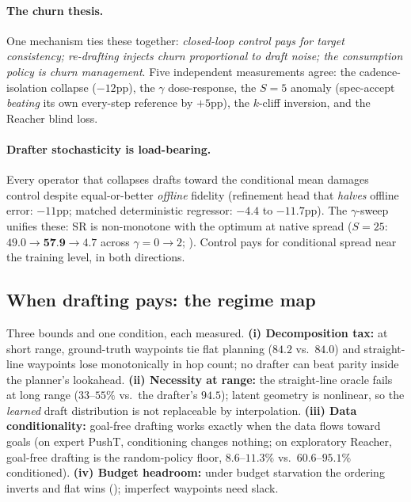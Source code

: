 \documentclass{article}
\newcommand{\ours}[1]{\textbf{#1}}
\begin{document}
\paragraph{The churn thesis.} One mechanism ties these together:
\emph{closed-loop control pays for target consistency; re-drafting injects
churn proportional to draft noise; the consumption policy is churn
management}. Five independent measurements agree: the cadence-isolation
collapse ($-12$pp), the $\gamma$ dose-response, the $S{=}5$ anomaly
(spec-accept \emph{beating} its own every-step reference by $+5$pp), the
$k$-cliff inversion, and the Reacher blind loss.

\paragraph{Drafter stochasticity is load-bearing.}\label{sec:why-spread}
Every operator that collapses drafts toward the conditional mean damages
control despite equal-or-better \emph{offline} fidelity (refinement head that
\emph{halves} offline error: $-11$pp; matched deterministic regressor: $-4.4$
to $-11.7$pp). The $\gamma$-sweep unifies these: SR is non-monotone with the
optimum at native spread ($S{=}25$: $49.0\to\ours{57.9}\to4.7$ across
$\gamma{=}0\to2$; ). Control pays for conditional spread near
the training level, in both directions.

\subsection{When drafting pays: the regime map}
\label{sec:why-regime}
Three bounds and one condition, each measured. \textbf{(i) Decomposition tax:}
at short range, ground-truth waypoints tie flat planning ($84.2$ vs.\ $84.0$)
and straight-line waypoints lose monotonically in hop count; no drafter can
beat parity inside the planner's lookahead.
\textbf{(ii) Necessity at range:} the straight-line oracle fails at long range
($33$--$55\%$ vs.\ the drafter's $94.5$); latent geometry is nonlinear, so the
\emph{learned} draft distribution is not replaceable by interpolation.
\textbf{(iii) Data conditionality:} goal-free drafting works exactly when the
data flows toward goals (on expert PushT, conditioning changes nothing; on
exploratory Reacher, goal-free drafting is the random-policy floor,
$8.6$--$11.3\%$ vs.\ $60.6$--$95.1\%$ conditioned). \textbf{(iv) Budget
headroom:} under budget starvation the ordering inverts and flat wins
(); imperfect waypoints need slack.
\end{document}
